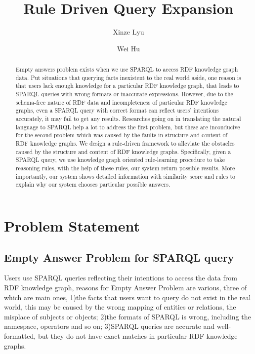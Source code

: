 \documentclass[runningheads]{llncs}
\begin{document}
%
\title{Rule Driven Query Expansion}
%
%
\author{Xinze Lyu \and
Wei Hu}
%
%
%
\maketitle              %
%
\begin{abstract}
  Empty answers problem exists when we use SPARQL to access RDF knowledge graph data. Put situations that querying facts inexistent to the real world aside, one reason is that users lack enough knowledge for a particular RDF knowledge graph, that leads to SPARQL queries with wrong formats or inaccurate expressions.  However, due to the schema-free nature of RDF data and incompleteness of particular RDF knowledge graphs, even a SPARQL query with correct format can reflect users' intentions accurately, it may fail to get any results. Researches going on in translating the natural language to SPARQL help a lot to address the first problem, but these are inconducive for the second problem which was caused by the faults in structure and content of RDF knowledge graphs.
  We design a rule-driven framework to alleviate the obstacles caused by the structure and content of RDF knowledge graphs. Specifically, given a SPARQL query, we use knowledge graph oriented rule-learning procedure to take reasoning rules, with the help of these rules, our system return possible results. More importantly, our system shows detailed information with similarity score and rules to explain why our system chooses particular possible answers.
\end{abstract}
%
%
%
\section{Problem Statement}
\subsection{Empty Answer Problem for SPARQL query}
Users use SPARQL queries reflecting their intentions to access the  data from RDF knowledge graph, reasons for Empty Answer Problem are various, three of which are main ones, 1)the facts that users want to query do not exist in the real world, this may be caused by the wrong mapping of entities or relations, the misplace of subjects or objects; 2)the formats of SPARQL is wrong, including  the namespace, operators and so on; 3)SPARQL queries are accurate and well-formatted, but they do not have exact matches in particular RDF knowledge graphs.
\end{document}

